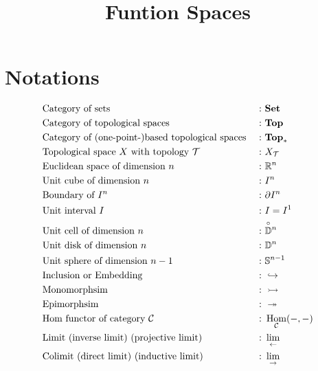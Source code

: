 \documentclass[a4paper]{article}
\theoremstyle{plain}
\theoremstyle{definition}
\theoremstyle{remark}
\newcommand{\mc}[1]{\mathcal{#1}}
\newcommand{\mbf}[1]{\mathbf{#1}}
\newcommand{\bbD}{\mathbb D}
\newcommand{\bbS}{\mathbb S}
\newcommand{\mcC}{\mc C}
\newcommand{\mcT}{\mc T}
\newcommand{\bbRn}{\mathbb R^n}
\newcommand{\unitcell}[1]{\overset{\!\!\!\! \circ}{\bbD^{#1}}}
\DeclareMathOperator{\Hom}{\rm{Hom}}
\begin{document}
    \title{Funtion Spaces}
    \author{{\color{pink}{Cloudi}}{\color{Aquamarine}{fold}}}
    \maketitle
    \newpage

    \setcounter{section}{-1}

    \section{Notations}
    
    \vspace*{0.3cm}

    \begin{align*}
        & \text{Category of sets } &: \ & \mbf{Set} \\
        & \text{Category of topological spaces }&: \ & \mbf{Top} \\
        & \text{Category of (one-point-)based topological spaces }&: \  & \mbf{Top}_* \\
        & \text{Topological space $X$ with topology $\mcT$ } &: \ & X_{\mcT}\\
        & \text{Euclidean space of dimension $n$ } &: \ & \bbRn\\
        & \text{Unit cube of dimension $n$ } &: \ & I^n\\
        & \text{Boundary of $I^n$ }          &: \ & \partial I^n\\
        & \text{Unit interval $I$}           &: \ & I = I^1\\
        & \text{Unit cell of dimension $n$ } &: \ & \unitcell{n} \\
        & \text{Unit disk of dimension $n$ } &: \ & \bbD^n\\
        & \text{Unit sphere of dimension $n-1$ } &: \ & \bbS^{n-1}\\
        & \text{Inclusion or Embedding } &: \ & \hookrightarrow \\
        & \text{Monomorphsim }      &: \ & \rightarrowtail \\
        & \text{Epimorphsim }       &: \ & \twoheadrightarrow \\
        & \text{Hom functor of category $\mcC $} &: \ & \Hom_{\mcC}(-,-)\\
        & \text{Limit (inverse limit) (projective limit) } &: \ & \lim_{\leftarrow} \\
        & \text{Colimit (direct limit) (inductive limit) } &: \ & \lim_{\rightarrow} \\
    \end{align*}
\end{document}
